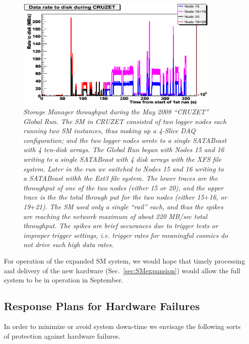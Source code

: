 \begin{figure}[t]
\begin{center}  
\includegraphics[width=0.9\textwidth]{Hardware/cruzetByNode}
\caption{\emph{Storage Manager throughput during the May 2008 ``CRUZET'' Global Run. 
The SM in CRUZET consisted of two logger nodes each running two SM instances,
thus making up a 4-Slice DAQ configuration; and the two logger nodes wrote
to a single SATABeast with 4 ten-disk arrays.
 The Global Run began with Nodes 15 and 16
writing to a single SATABeast with 4 disk arrays with the XFS file system.
Later in the run we switched to Nodes 15 and 16 writing to a SATABeast withh the Ext3
file system.
The lower traces are the throughput of one of the two nodes
(either 15 or 20), and the upper trace is the the total through put for
the two nodes (either 15$+$16, or 19$+$21). 
The SM used only a single ``rail'' each, and thus the spikes are reaching the network 
maximum of about 220 MB/sec total throughput. The spikes are brief occurances
due to trigger tests or improper trigger settings, 
i.e.  trigger rates for meaningful cosmics do not drive such high data rates.}}
\label{fig:cruzet}
\end{center}
\end{figure}  

For operation of the expanded SM system, we
would hope that timely processing and delivery of the new
hardware (Sec.~\ref{sec:SMexpansion}) would allow the full system 
to be in operation in September. 


\subsection{Response Plans for Hardware Failures \label{sec:SMhardfail}}

In order to minimize or avoid system down-time we envisage the following
sorts of protection against hardware failures.

